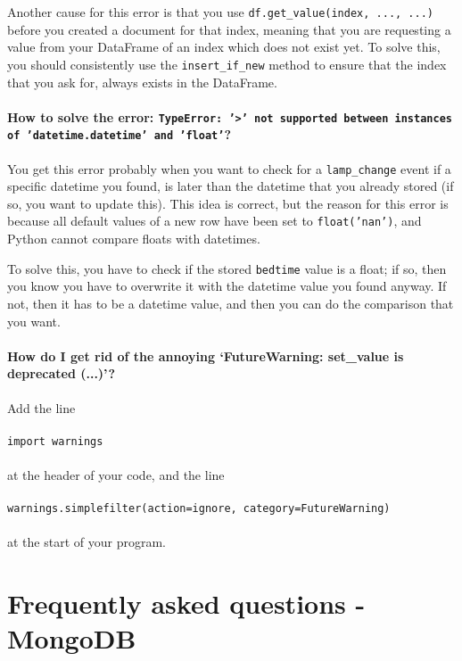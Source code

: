 \documentclass[a4paper]{report}
\theoremstyle{definition}
\newcommand{\singlequote}{\char13}
\begin{document}
Another cause for this error is that you use \texttt{df.get\_value(index, ..., ...)} before you created a document for that index, meaning that you are requesting a value from your DataFrame of an index which does not exist yet. To solve this, you should consistently use the \texttt{insert\_if\_new} method to ensure that the index that you ask for, always exists in the DataFrame.

\paragraph{How to solve the error: \texttt{TypeError: '>' not supported between instances of 'datetime.datetime' and 'float'}?}
You get this error probably when you want to check for a \texttt{lamp\_change} event if a specific datetime you found, is later than the datetime that you already stored (if so, you want to update this). This idea is correct, but the reason for this error is because all default values of a new row have been set to \texttt{float('nan')}, and Python cannot compare floats with datetimes.

To solve this, you have to check if the stored \texttt{bedtime} value is a float; if so, then you know you have to overwrite it with the datetime value you found anyway. If not, then it has to be a datetime value, and then you can do the comparison that you want.

\paragraph{How do I get rid of the annoying `FutureWarning: set\_value is deprecated (...)'?}
Add the line\\\\
\texttt{import warnings}\\\\
at the header of your code, and the line\\\\
\texttt{warnings.simplefilter(action=\singlequote{}ignore\singlequote{}, category=FutureWarning)}\\\\
at the start of your program.

\section*{Frequently asked questions - MongoDB}
\end{document}
